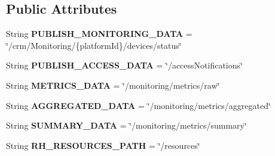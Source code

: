 \subsection*{Public Attributes}
\begin{DoxyCompactItemize}
\item 
\mbox{\label{interfaceeu_1_1h2020_1_1symbiote_1_1client_1_1ClientConstants_a965c5aa29e0e8f67ca74e619f00086c9}} 
String {\bfseries P\+U\+B\+L\+I\+S\+H\+\_\+\+M\+O\+N\+I\+T\+O\+R\+I\+N\+G\+\_\+\+D\+A\+TA} = \char`\"{}/crm/Monitoring/\{platform\+Id\}/devices/status\char`\"{}
\item 
\mbox{\label{interfaceeu_1_1h2020_1_1symbiote_1_1client_1_1ClientConstants_af084b0c3d596d161cb8d0967e16e07a3}} 
String {\bfseries P\+U\+B\+L\+I\+S\+H\+\_\+\+A\+C\+C\+E\+S\+S\+\_\+\+D\+A\+TA} = \char`\"{}/access\+Notifications\char`\"{}
\item 
\mbox{\label{interfaceeu_1_1h2020_1_1symbiote_1_1client_1_1ClientConstants_a9e3c38af9463cd01cd3ca9cb00cb98a5}} 
String {\bfseries M\+E\+T\+R\+I\+C\+S\+\_\+\+D\+A\+TA} = \char`\"{}/monitoring/metrics/raw\char`\"{}
\item 
\mbox{\label{interfaceeu_1_1h2020_1_1symbiote_1_1client_1_1ClientConstants_ad038d0f07f60e691d46e3988123b6b00}} 
String {\bfseries A\+G\+G\+R\+E\+G\+A\+T\+E\+D\+\_\+\+D\+A\+TA} = \char`\"{}/monitoring/metrics/aggregated\char`\"{}
\item 
\mbox{\label{interfaceeu_1_1h2020_1_1symbiote_1_1client_1_1ClientConstants_a078dd7031b00faa26593890860c1c2ae}} 
String {\bfseries S\+U\+M\+M\+A\+R\+Y\+\_\+\+D\+A\+TA} = \char`\"{}/monitoring/metrics/summary\char`\"{}
\item 
\mbox{\label{interfaceeu_1_1h2020_1_1symbiote_1_1client_1_1ClientConstants_a14e38274d7ac73f8fcadf05d5f0c8772}} 
String {\bfseries R\+H\+\_\+\+R\+E\+S\+O\+U\+R\+C\+E\+S\+\_\+\+P\+A\+TH} = \char`\"{}/resources\char`\"{}
\item 

\end{DoxyCompactItemize}
